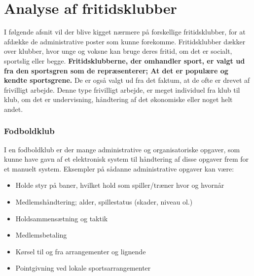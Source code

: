 \chapter{Analyse af fritidsklubber} \label{Fritidsklubber} 

I følgende afsnit vil der blive kigget nærmere på forskellige fritidsklubber, for at afdække de administrative
poster som kunne forekomme. Fritidsklubber dækker over klubber, hvor unge og voksne kan bruge deres fritid, om
det er socialt, sportslig eller begge. \textbf{Fritidsklubberne, der omhandler sport, er valgt ud fra den
sportsgren som de repræsenterer; At det er populære og kendte sportsgrene.}  De er også valgt ud
fra det faktum, at de ofte er drevet af frivilligt arbejde. Denne type frivilligt arbejde, er meget individuel
fra klub til klub, om det er undervisning, håndtering af det økonomiske eller noget helt andet. 



\subsection{Fodboldklub} \label{Fodbold}

I en fodboldklub er der mange administrative og organisatoriske opgaver, som kunne have gavn af et elektronisk
system til håndtering af disse opgaver frem for et manuelt system. Eksempler på sådanne administrative opgaver
kan være:

\begin{itemize}
  \item Holde styr på baner, hvilket hold som spiller/træner hvor og hvornår
  \item Medlemshåndtering; alder, spillestatus (skader, niveau ol.) 
  \item Holdsammensætning og taktik 
  \item Medlemsbetaling 
  \item Kørsel til og fra arrangementer og lignende
  \item Pointgivning ved lokale sportsarrangementer
\end{itemize}

